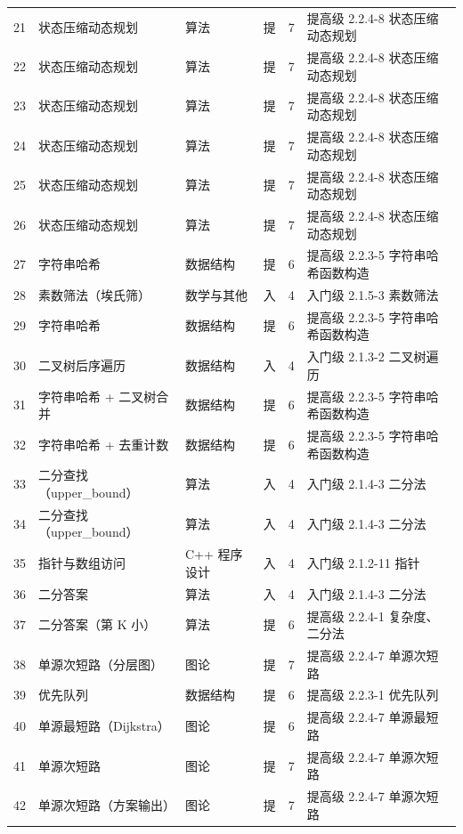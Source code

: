 \documentclass[11pt]{ctexart}
\begin{document}
\begin{longtable}{cllccp{5.9cm}}
21 & 状态压缩动态规划 & 算法 & 提 & 7 & 提高级 2.2.4-8 状态压缩动态规划 \\
22 & 状态压缩动态规划 & 算法 & 提 & 7 & 提高级 2.2.4-8 状态压缩动态规划 \\
23 & 状态压缩动态规划 & 算法 & 提 & 7 & 提高级 2.2.4-8 状态压缩动态规划 \\
24 & 状态压缩动态规划 & 算法 & 提 & 7 & 提高级 2.2.4-8 状态压缩动态规划 \\
25 & 状态压缩动态规划 & 算法 & 提 & 7 & 提高级 2.2.4-8 状态压缩动态规划 \\
26 & 状态压缩动态规划 & 算法 & 提 & 7 & 提高级 2.2.4-8 状态压缩动态规划 \\
27 & 字符串哈希 & 数据结构 & 提 & 6 & 提高级 2.2.3-5 字符串哈希函数构造 \\
28 & 素数筛法（埃氏筛） & 数学与其他 & 入 & 4 & 入门级 2.1.5-3 素数筛法 \\
29 & 字符串哈希 & 数据结构 & 提 & 6 & 提高级 2.2.3-5 字符串哈希函数构造 \\
30 & 二叉树后序遍历 & 数据结构 & 入 & 4 & 入门级 2.1.3-2 二叉树遍历 \\
31 & 字符串哈希 + 二叉树合并 & 数据结构 & 提 & 6 & 提高级 2.2.3-5 字符串哈希函数构造 \\
32 & 字符串哈希 + 去重计数 & 数据结构 & 提 & 6 & 提高级 2.2.3-5 字符串哈希函数构造 \\
33 & 二分查找（upper\_bound） & 算法 & 入 & 4 & 入门级 2.1.4-3 二分法 \\
34 & 二分查找（upper\_bound） & 算法 & 入 & 4 & 入门级 2.1.4-3 二分法 \\
35 & 指针与数组访问 & C++ 程序设计 & 入 & 4 & 入门级 2.1.2-11 指针 \\
36 & 二分答案 & 算法 & 入 & 4 & 入门级 2.1.4-3 二分法 \\
37 & 二分答案（第 K 小） & 算法 & 提 & 6 & 提高级 2.2.4-1 复杂度、二分法 \\
38 & 单源次短路（分层图） & 图论 & 提 & 7 & 提高级 2.2.4-7 单源次短路 \\
39 & 优先队列 & 数据结构 & 提 & 6 & 提高级 2.2.3-1 优先队列 \\
40 & 单源最短路（Dijkstra） & 图论 & 提 & 6 & 提高级 2.2.4-7 单源最短路 \\
41 & 单源次短路 & 图论 & 提 & 7 & 提高级 2.2.4-7 单源次短路 \\
42 & 单源次短路（方案输出） & 图论 & 提 & 7 & 提高级 2.2.4-7 单源次短路 \\
\bottomrule
\end{longtable}
\endgroup
\end{document}
